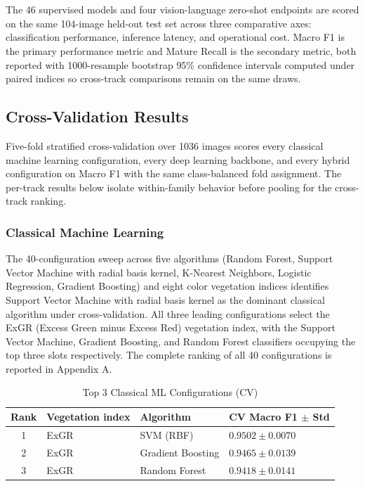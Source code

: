 \chapter{\babEmpat}

The 46 supervised models and four vision-language zero-shot endpoints are scored on the same 104-image held-out test set across three comparative axes: classification performance, inference latency, and operational cost. Macro F1 is the primary performance metric and Mature Recall is the secondary metric, both reported with 1000-resample bootstrap 95\% confidence intervals computed under paired indices so cross-track comparisons remain on the same draws.


\section{Cross-Validation Results}

Five-fold stratified cross-validation over 1036 images scores every classical machine learning configuration, every deep learning backbone, and every hybrid configuration on Macro F1 with the same class-balanced fold assignment. The per-track results below isolate within-family behavior before pooling for the cross-track ranking.

\subsection{Classical Machine Learning}

The 40-configuration sweep across five algorithms (Random Forest, Support Vector Machine with radial basis kernel, K-Nearest Neighbors, Logistic Regression, Gradient Boosting) and eight color vegetation indices identifies Support Vector Machine with radial basis kernel as the dominant classical algorithm under cross-validation. All three leading configurations select the ExGR (Excess Green minus Excess Red) vegetation index, with the Support Vector Machine, Gradient Boosting, and Random Forest classifiers occupying the top three slots respectively. The complete ranking of all 40 configurations is reported in Appendix A.

\begin{table}[H]
    \centering
    \caption{Top 3 Classical ML Configurations (CV)}
    \label{tab:cv-ml-top3}
    \begin{tabular}{clll}
        \hline
        Rank & Vegetation index & Algorithm & CV Macro F1 $\pm$ Std \\
        \hline
        1 & ExGR & SVM (RBF) & $0.9502 \pm 0.0070$ \\
        2 & ExGR & Gradient Boosting & $0.9465 \pm 0.0139$ \\
        3 & ExGR & Random Forest & $0.9418 \pm 0.0141$ \\
        \hline
    \end{tabular}
\end{table}

